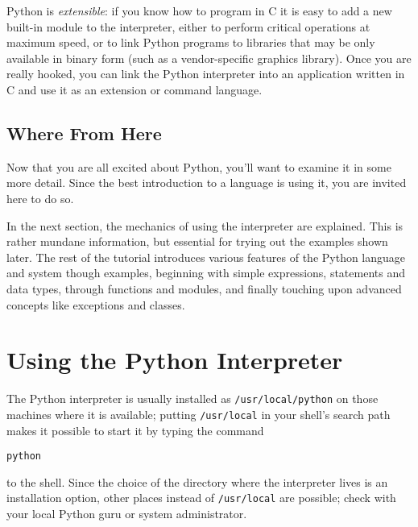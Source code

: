 Python is
{\em extensible}:
if you know how to program in C it is easy to add a new built-in module
to the interpreter, either to perform critical operations at maximum
speed, or to link Python programs to libraries that may be only available
in binary form (such as a vendor-specific graphics library).
Once you are really hooked, you can link the Python interpreter into an
application written in C and use it as an extension or command language.

\subsection{Where From Here}

Now that you are all excited about Python, you'll want to examine it in
some more detail.
Since the best introduction to a language is using it, you are invited
here to do so.

In the next section, the mechanics of using the interpreter are
explained.
This is rather mundane information, but essential for trying out the
examples shown later.
The rest of the tutorial introduces various features of the Python
language and system though examples, beginning with simple expressions,
statements and data types, through functions and modules, and finally
touching upon advanced concepts like exceptions and classes.

\section{Using the Python Interpreter}

The Python interpreter is usually installed as
{\tt /usr/local/python}
on those machines where it is available; putting
{\tt /usr/local}
in your {\UNIX} shell's search path makes it possible to start it by
typing the command
\bcode\begin{verbatim}
python
\end{verbatim}\ecode
to the shell.
Since the choice of the directory where the interpreter lives is an
installation option, other places instead of
{\tt /usr/local}
are possible; check with your local Python guru or system
administrator.

